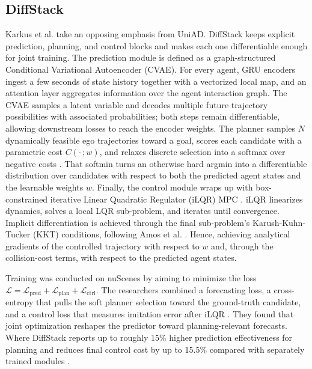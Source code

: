 \subsection{DiffStack}
\label{subsection:DiffStack}

Karkus et al. \cite{karkus_DiffStackDifferentiableModular_2022} take an opposing emphasis from UniAD.
DiffStack keeps explicit prediction, planning, and control blocks and makes each one differentiable enough for joint training.
The prediction module is defined as a graph-structured Conditional Variational Autoencoder (CVAE).
For every agent, GRU encoders ingest a few seconds of state history together with a vectorized local map, and an attention layer aggregates information over the agent interaction graph.
The CVAE samples a latent variable and decodes multiple future trajectory possibilities with associated probabilities; both steps remain differentiable, allowing downstream losses to reach the encoder weights.
The planner samples $N$ dynamically feasible ego trajectories toward a goal, scores each candidate with a parametric cost $C(\cdot \,; w)$, and relaxes discrete selection into a softmax over negative costs \cite{karkus_DiffStackDifferentiableModular_2022}.
That softmin turns an otherwise hard argmin into a differentiable distribution over candidates with respect to both the predicted agent states and the learnable weights $w$.
Finally, the control module wraps up with box-constrained iterative Linear Quadratic Regulator (iLQR) MPC \cite{karkus_DiffStackDifferentiableModular_2022}.
iLQR linearizes dynamics, solves a local LQR sub-problem, and iterates until convergence.
Implicit differentiation is achieved through the final sub-problem's Karush-Kuhn-Tucker (KKT) conditions, following Amos et al. \cite{amos_OptNetDifferentiableOptimization_2017, karkus_DiffStackDifferentiableModular_2022}.
Hence, achieving analytical gradients of the controlled trajectory with respect to $w$ and, through the collision-cost terms, with respect to the predicted agent states.

Training was conducted on nuScenes \cite{caesar_nuScenesMultimodalDataset_2020} by aiming to minimize the loss $\mathcal{L} = \mathcal{L}_{\text{pred}} + \mathcal{L}_{\text{plan}} + \mathcal{L}_{\text{ctrl}}$.
The researchers combined a forecasting loss, a cross-entropy that pulls the soft planner selection toward the ground-truth candidate, and a control loss that measures imitation error after iLQR \cite{karkus_DiffStackDifferentiableModular_2022}.
They found that joint optimization reshapes the predictor toward planning-relevant forecasts.
Where DiffStack reports up to roughly 15\% higher prediction effectiveness for planning and reduces final control cost by up to 15.5\% compared with separately trained modules \cite{karkus_DiffStackDifferentiableModular_2022}.

